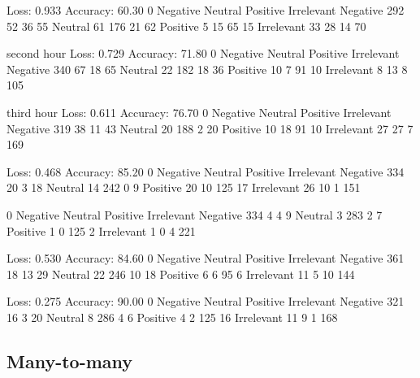\documentclass[10pt]{amsart}
\theoremstyle{definition}
\begin{document}
Loss: 0.933 Accuracy: 60.30%
0	Negative	Neutral	Positive	Irrelevant
Negative	292	52	36	55
Neutral	61	176	21	62
Positive	5	15	65	15
Irrelevant	33	28	14	70


second hour
Loss: 0.729 Accuracy: 71.80%
0	Negative	Neutral	Positive	Irrelevant
Negative	340	67	18	65
Neutral	22	182	18	36
Positive	10	7	91	10
Irrelevant	8	13	8	105

third hour
Loss: 0.611 Accuracy: 76.70%
0	Negative	Neutral	Positive	Irrelevant
Negative	319	38	11	43
Neutral	20	188	2	20
Positive	10	18	91	10
Irrelevant	27	27	7	169

Loss: 0.468 Accuracy: 85.20%
0	Negative	Neutral	Positive	Irrelevant
Negative	334	20	3	18
Neutral	14	242	0	9
Positive	20	10	125	17
Irrelevant	26	10	1	151

0	Negative	Neutral	Positive	Irrelevant
Negative	334	4	4	9
Neutral	3	283	2	7
Positive	1	0	125	2
Irrelevant	1	0	4	221

Loss: 0.530 Accuracy: 84.60%
0	Negative	Neutral	Positive	Irrelevant
Negative	361	18	13	29
Neutral	22	246	10	18
Positive	6	6	95	6
Irrelevant	11	5	10	144


Loss: 0.275 Accuracy: 90.00%
0	Negative	Neutral	Positive	Irrelevant
Negative	321	16	3	20
Neutral	8	286	4	6
Positive	4	2	125	16
Irrelevant	11	9	1	168

\subsection{Many-to-many} 
\end{document}
